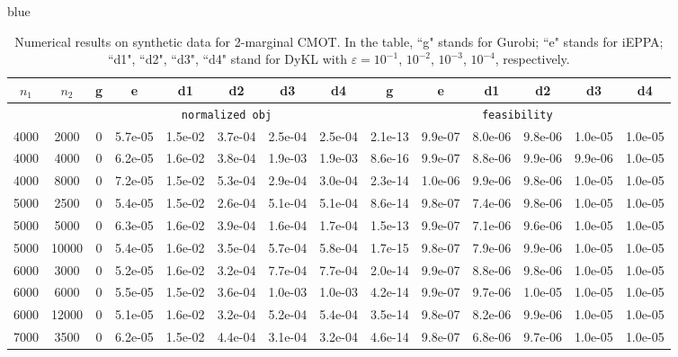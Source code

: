 \documentclass[10pt]{article}
\newcommand{\blue}[1]{\begin{color}{blue}#1\end{color}}
\begin{document}
\begin{table}[h]
\centering
\captionsetup{width=15cm}
\caption{Numerical results on synthetic data for 2-marginal CMOT. In the table, ``g" stands for Gurobi; ``e" stands for iEPPA; ``d1",
``d2", ``d3", ``d4"  stand for DyKL with $\varepsilon = 10^{-1}$,  $10^{-2}$,  $10^{-3}$, $10^{-4}$, respectively.}\label{tab:gaussianmixture}
\renewcommand{\arraystretch}{1.05}
\tabcolsep 3.5pt
\blue{{\footnotesize
\begin{tabular}{|cc|cccccc|rrrrrr|}\hline
	$n_1$ & $n_2$ & g & e & d1 & d2 & d3 & d4 &
\multicolumn{1}{c}{g} & \multicolumn{1}{c}{e} & \multicolumn{1}{c}{d1} & \multicolumn{1}{c}{d2} & \multicolumn{1}{c}{d3} & \multicolumn{1}{c|}{d4} \\ \hline
	         &       & \multicolumn{6}{c|}{\texttt{normalized obj}} & \multicolumn{6}{c|}{\texttt{feasibility}}\\ \hline
4000 & 2000 & 0 & 5.7e-05 & 1.5e-02 & 3.7e-04 & 2.5e-04 & 2.5e-04 & 2.1e-13 & 9.9e-07 & 8.0e-06 & 9.8e-06 & 1.0e-05 & 1.0e-05 \\
4000 & 4000 & 0 & 6.2e-05 & 1.6e-02 & 3.8e-04 & 1.9e-03 & 1.9e-03 & 8.6e-16 & 9.9e-07 & 8.8e-06 & 9.9e-06 & 9.9e-06 & 1.0e-05 \\
4000 & 8000 & 0 & 7.2e-05 & 1.5e-02 & 5.3e-04 & 2.9e-04 & 3.0e-04 & 2.3e-14 & 1.0e-06 & 9.9e-06 & 9.8e-06 & 1.0e-05 & 1.0e-05 \\
5000 & 2500 & 0 & 5.4e-05 & 1.5e-02 & 2.6e-04 & 5.1e-04 & 5.1e-04 & 8.6e-14 & 9.8e-07 & 7.4e-06 & 9.8e-06 & 1.0e-05 & 1.0e-05 \\
5000 & 5000 & 0 & 6.3e-05 & 1.6e-02 & 3.9e-04 & 1.6e-04 & 1.7e-04 & 1.5e-13 & 9.9e-07 & 7.1e-06 & 9.6e-06 & 1.0e-05 & 1.0e-05 \\
5000 & 10000 & 0 & 5.4e-05 & 1.6e-02 & 3.5e-04 & 5.7e-04 & 5.8e-04 & 1.7e-15 & 9.8e-07 & 7.9e-06 & 9.9e-06 & 1.0e-05 & 1.0e-05 \\
6000 & 3000 & 0 & 5.2e-05 & 1.6e-02 & 3.2e-04 & 7.7e-04 & 7.7e-04 & 2.0e-14 & 9.9e-07 & 8.8e-06 & 9.8e-06 & 1.0e-05 & 1.0e-05 \\
6000 & 6000 & 0 & 5.5e-05 & 1.5e-02 & 3.6e-04 & 1.0e-03 & 1.0e-03 & 4.2e-14 & 9.9e-07 & 9.7e-06 & 1.0e-05 & 1.0e-05 & 1.0e-05 \\
6000 & 12000 & 0 & 5.1e-05 & 1.6e-02 & 3.2e-04 & 5.2e-04 & 5.4e-04 & 3.5e-14 & 9.8e-07 & 8.2e-06 & 9.9e-06 & 1.0e-05 & 1.0e-05 \\
7000 & 3500 & 0 & 6.2e-05 & 1.5e-02 & 4.4e-04 & 3.1e-04 & 3.2e-04 & 4.6e-14 & 9.8e-07 & 6.8e-06 & 9.7e-06 & 1.0e-05 & 1.0e-05 \\

\end{tabular}}}
\end{table}
\end{document}
